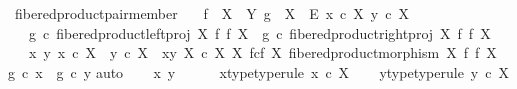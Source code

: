 \begin{isabellebody}
\isamarkupfalse%
\ fibered{\isacharunderscore}{\kern0pt}product{\isacharunderscore}{\kern0pt}pair{\isacharunderscore}{\kern0pt}member{}{\isacharcolon}{\kern0pt}\isanewline
\ \ \ {\isachardoublequoteopen}f\ {\isacharcolon}{\kern0pt}\ X\ {\isasymrightarrow}\ Y{\isachardoublequoteclose}\ {\isachardoublequoteopen}g\ {\isacharcolon}{\kern0pt}\ X\ {\isasymrightarrow}\ E{\isachardoublequoteclose}\ {\isachardoublequoteopen}x\ {\isasymin}\isactrlsub c\ X{\isachardoublequoteclose}\ {\isachardoublequoteopen}y\ {\isasymin}\isactrlsub c\ X{\isachardoublequoteclose}\isanewline
\ \ \ {\isachardoublequoteopen}g\ {\isasymcirc}\isactrlsub c\ fibered{\isacharunderscore}{\kern0pt}product{\isacharunderscore}{\kern0pt}left{\isacharunderscore}{\kern0pt}proj\ X\ f\ f\ X\ {\isacharequal}{\kern0pt}\ g\ {\isasymcirc}\isactrlsub c\ fibered{\isacharunderscore}{\kern0pt}product{\isacharunderscore}{\kern0pt}right{\isacharunderscore}{\kern0pt}proj\ X\ f\ f\ X{\isachardoublequoteclose}\isanewline
\ \ \ {\isachardoublequoteopen}{\isasymforall}x\ y{\isachardot}{\kern0pt}\ x\ {\isasymin}\isactrlsub c\ X\ {\isasymlongrightarrow}\ y\ {\isasymin}\isactrlsub c\ X\ {\isasymlongrightarrow}\ {\isasymlangle}x{\isacharcomma}{\kern0pt}y{\isasymrangle}\ {\isasymin}\isactrlbsub X\ {\isasymtimes}\isactrlsub c\ X\isactrlesub \ {\isacharparenleft}{\kern0pt}X\ \isactrlbsub f\isactrlesub {\isasymtimes}\isactrlsub c\isactrlbsub f\isactrlesub \ X{\isacharcomma}{\kern0pt}\ fibered{\isacharunderscore}{\kern0pt}product{\isacharunderscore}{\kern0pt}morphism\ X\ f\ f\ X{\isacharparenright}{\kern0pt}\ {\isasymlongrightarrow}\ g\ {\isasymcirc}\isactrlsub c\ x\ {\isacharequal}{\kern0pt}\ g\ {\isasymcirc}\isactrlsub c\ y{\isachardoublequoteclose}\isanewline
%
\isadelimproof
%
\endisadelimproof
%
\isatagproof
{}\isamarkupfalse%
{\isacharparenleft}{\kern0pt}auto{\isacharparenright}{\kern0pt}\isanewline
\ \ \isamarkupfalse%
\ x\ y\ \ \isanewline
\ \ \isamarkupfalse%
\ x{\isacharunderscore}{\kern0pt}type{\isacharbrackleft}{\kern0pt}type{\isacharunderscore}{\kern0pt}rule{\isacharbrackright}{\kern0pt}{\isacharcolon}{\kern0pt}\ {\isachardoublequoteopen}x\ {\isasymin}\isactrlsub c\ X{\isachardoublequoteclose}\isanewline
\ \ \isamarkupfalse%
\ y{\isacharunderscore}{\kern0pt}type{\isacharbrackleft}{\kern0pt}type{\isacharunderscore}{\kern0pt}rule{\isacharbrackright}{\kern0pt}{\isacharcolon}{\kern0pt}\ {\isachardoublequoteopen}y\ {\isasymin}\isactrlsub c\ X{\isachardoublequoteclose}\isanewline

\end{isabellebody}
